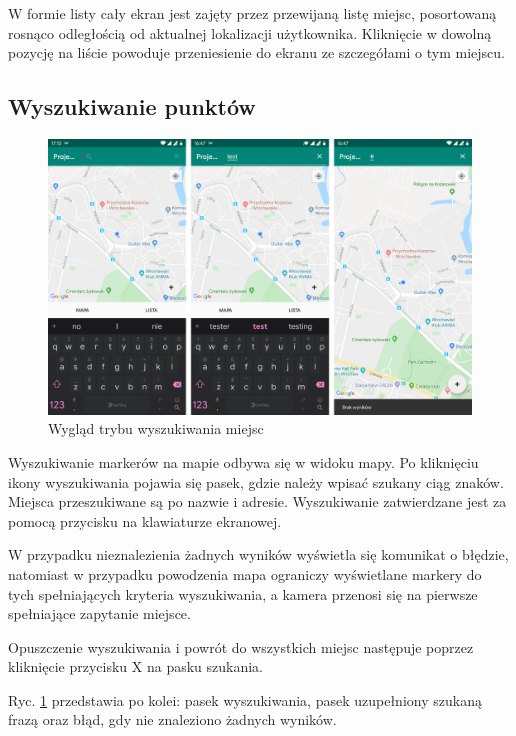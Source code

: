 \documentclass[polish,polish,a4paper,12pt]{article}
\begin{document}
	W formie listy cały ekran jest zajęty przez przewijaną listę miejsc, posortowaną rosnąco odległością od aktualnej lokalizacji użytkownika. Kliknięcie w dowolną pozycję na liście powoduje przeniesienie do ekranu ze szczegółami o tym miejscu.

	\subsection{Wyszukiwanie punktów}

	\begin{figure}[H]
		\centering
		\includegraphics[width = \textwidth]{screenshot-search}
		\caption{Wygląd trybu wyszukiwania miejsc}
		\label{fig:screenshotsearch}
	\end{figure}

	Wyszukiwanie markerów na mapie odbywa się w widoku mapy. Po kliknięciu ikony wyszukiwania pojawia się pasek, gdzie należy wpisać szukany ciąg znaków. Miejsca przeszukiwane są po nazwie i adresie. Wyszukiwanie zatwierdzane jest za pomocą przycisku na klawiaturze ekranowej.

	W przypadku nieznalezienia żadnych wyników wyświetla się komunikat o błędzie, natomiast w przypadku powodzenia mapa ograniczy wyświetlane markery do tych spełniających kryteria wyszukiwania, a kamera przenosi się na pierwsze spełniające zapytanie miejsce.

	Opuszczenie wyszukiwania i powrót do wszystkich miejsc następuje poprzez kliknięcie przycisku X na pasku szukania.

	Ryc. \ref{fig:screenshotsearch} przedstawia po kolei: pasek wyszukiwania, pasek uzupełniony szukaną frazą oraz błąd, gdy nie znaleziono żadnych wyników.
\end{document}
